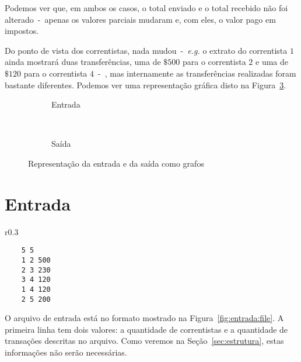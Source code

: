 \documentclass[12pt]{article}
\begin{document}
Podemos ver que, em ambos os casos, o total enviado e o total recebido não foi
alterado~-~apenas os valores parciais mudaram e, com eles, o valor pago em impostos.

Do ponto de vista dos correntistas, nada mudou~-~\textit{e.g.} o extrato do
correntista $1$ ainda mostrará duas transferências, uma de $\$500$ para o
correntista $2$ e uma de $\$120$ para o correntista $4$~-~, mas internamente as
transferências realizadas foram bastante diferentes. Podemos ver uma
representação gráfica disto na Figura~\ref{fig:intro}.

\begin{figure}[htb!]
  \centering
  \begin{subfigure}[b]{0.5\textwidth}
    \begin{dot2tex}[neato,options=-tmath]
        
    \end{dot2tex}
    \caption{Entrada}
    \label{fig:intro:entrada}
  \end{subfigure}%
  ~
  \begin{subfigure}[b]{0.5\textwidth}
    \begin{dot2tex}[neato,options=-tmath]
        
    \end{dot2tex}
    \caption{Saída}
    \label{fig:intro:saída}
  \end{subfigure}
  \caption{Representação da entrada e da saída como grafos}
  \label{fig:intro}
\end{figure}

\section{Entrada}\label{sec:entrada}

\begin{wrapfigure}{r}{0.3\textwidth}
  \vspace{-20pt}
  \begin{center}
    \begin{lstlisting}
    5 5
    1 2 500
    2 3 230
    3 4 120
    1 4 120
    2 5 200
    \end{lstlisting}
  \end{center}
  \caption{Arquivo de entrada}
  \vspace{-10pt}
\label{fig:entrada:file}
\end{wrapfigure}

O arquivo de entrada está no formato mostrado na Figura~\ref{fig:entrada:file}.
A primeira linha tem dois valores: a quantidade de correntistas e a quantidade
de transações descritas no arquivo. Como veremos na Seção~\ref{sec:estrutura},
estas informações não serão necessárias.
\end{document}
